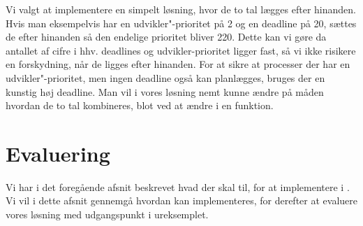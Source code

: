 Vi valgt at implementere en simpelt løsning, hvor  de to tal lægges efter hinanden. Hvis man eksempelvis har en udvikler"-prioritet på 2 og en deadline på 20, sættes de efter hinanden så den endelige prioritet bliver 220. Dette kan vi gøre da antallet af cifre i hhv. deadlines og udvikler-prioritet ligger fast, så vi ikke risikere en forskydning, når de ligges efter hinanden. For at sikre at processer der har en udvikler"-prioritet, men ingen deadline også kan planlægges, bruges der en kunstig høj deadline. Man vil i vores løsning nemt kunne ændre på måden hvordan de to tal kombineres, blot ved at ændre i en funktion. 




    
\section{Evaluering}
Vi har i det foregående afsnit beskrevet hvad der skal til, for at implementere \is i \pycsp. Vi vil i dette afsnit gennemgå hvordan \is kan implementeres, for derefter at evaluere vores løsning med udgangspunkt i ureksemplet.

